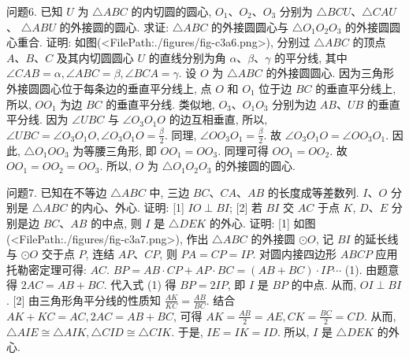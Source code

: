 问题6. 已知 $U$ 为 $\triangle A B C$ 的内切圆的圆心, $O_1 、 O_2 、 O_3$ 分别为 $\triangle B C U 、 \triangle C A U$ 、 $\triangle A B U$ 的外接圆的圆心.
求证: $\triangle A B C$ 的外接圆圆心与 $\triangle O_1 O_2 O_3$ 的外接圆圆心重合.
证明: 如图(<FilePath:./figures/fig-c3a6.png>), 分别过 $\triangle A B C$ 的顶点 $A 、 B 、 C$ 及其内切圆圆心 $U$ 的直线分别为角 $\alpha 、 \beta 、 \gamma$ 的平分线, 其中 $\angle C A B=\alpha, \angle A B C=\beta, \angle B C A=\gamma$. 设 $O$ 为 $\triangle A B C$ 的外接圆圆心.
因为三角形外接圆圆心位于每条边的垂直平分线上, 点 $O$ 和 $O_1$ 位于边 $B C$ 的垂直平分线上, 所以, $O O_1$ 为边 $B C$ 的垂直平分线.
类似地, $O_3 、 O_1 O_3$ 分别为边 $A B 、 U B$ 的垂直平分线.
因为 $\angle U B C$ 与 $\angle O_3 O_1 O$ 的边互相垂直, 所以, $\angle U B C=\angle O_3 O_1 O, \angle O_3 O_1 O=\frac{\beta}{2}$.
同理, $\angle O O_3 O_1=\frac{\beta}{2}$. 故 $\angle O_3 O_1 O=\angle O O_3 O_1$. 因此, $\triangle O_1 O O_3$ 为等腰三角形, 即 $O O_1=O O_3$. 同理可得 $O O_1=O O_2$. 故 $O O_1=O O_2=O O_3$.
所以, $O$ 为 $\triangle O_1 O_2 O_3$ 的外接圆的圆心.



问题7. 已知在不等边 $\triangle A B C$ 中, 三边 $B C 、 C A 、 A B$ 的长度成等差数列.
$I 、 O$ 分别是 $\triangle A B C$ 的内心、外心.
证明: [1] $I O \perp B I$; [2] 若 $B I$ 交 $A C$ 于点 $K$, $D 、 E$ 分别是边 $B C 、 A B$ 的中点, 则 $I$ 是 $\triangle D E K$ 的外心.
证明: [1] 如图(<FilePath:./figures/fig-c3a7.png>), 作出 $\triangle A B C$ 的外接圆 $\odot O$, 记 $B I$ 的延长线与 $\odot O$ 交于点 $P$, 连结 $A P 、 C P$, 则 $P A=C P= I P$. 对圆内接四边形 $A B C P$ 应用托勒密定理可得: $A C$. $B P=A B \cdot C P+A P \cdot B C=(A B+B C) \cdot I P \cdots$ (1). 由题意得 $2 A C=A B+B C$. 代入式 (1) 得 $B P=2 I P$, 即 $I$ 是 $B P$ 的中点.
从而, $O I \perp B I$.
[2] 由三角形角平分线的性质知 $\frac{A K}{K C}=\frac{A B}{B C}$. 结合
$A K+K C=A C, 2 A C=A B+B C$, 可得 $A K=\frac{A B}{2}= A E, C K=\frac{B C}{2}=C D$. 从而, $\triangle A I E \cong \triangle A I K, \triangle C I D \cong \triangle C I K$. 于是, $I E= I K=I D$. 所以, $I$ 是 $\triangle D E K$ 的外心.



